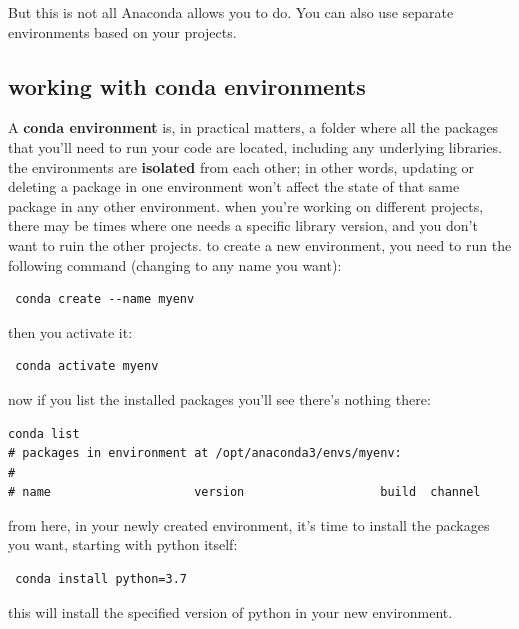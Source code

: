 But this is not all Anaconda allows you to do. You can also use separate environments based on your projects.

\subsection{working with conda environments}\label{subsec:conda-environments}
A \textbf{conda environment} is, in practical matters, a folder where all the packages that you'll need to run your code are located, including any underlying libraries. the environments are \textbf{isolated} from each other; in other words, updating or deleting a package in one environment won't affect the state of that same package in any other environment. when you're working on different projects, there may be times where one needs a specific library version, and you don't want to ruin the other projects. to create a new environment, you need to run the following command (changing  to any name you want):

\begin{verbatim}
 conda create --name myenv
\end{verbatim}

then you activate it:

\begin{verbatim}
 conda activate myenv
\end{verbatim}

now if you list the installed packages you'll see there's nothing there:

\begin{verbatim}
conda list
# packages in environment at /opt/anaconda3/envs/myenv:
#
# name                    version                   build  channel
\end{verbatim}

from here, in your newly created environment, it's time to install the packages you want, starting with python itself:

\begin{verbatim}
 conda install python=3.7
\end{verbatim}

this will install the specified version of python in your new environment.


